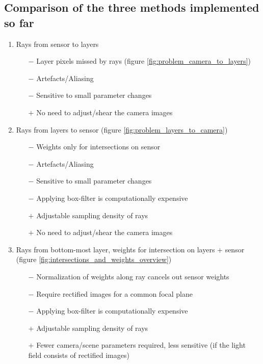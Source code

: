 \documentclass[11pt,a4paper,titlepage]{article}
\begin{document}
\subsection{Comparison of the three methods implemented so far}

\begin{enumerate}
	\item	Rays from sensor to layers
		\begin{itemize}
			\item[$-$]	Layer pixels missed by rays	(figure \ref{fig:problem_camera_to_layers})
			\item[$-$]	Artefacts/Aliasing
			\item[$-$]	Sensitive to small parameter changes
			\item[$+$]	No need to adjust/shear the camera images
		\end{itemize}
	\item	Rays from layers to sensor (figure \ref{fig:problem_layers_to_camera})
		\begin{itemize}
			\item[$-$]	Weights only for intersections on sensor 
			\item[$-$]	Artefacts/Aliasing
			\item[$-$]	Sensitive to small parameter changes
			\item[$-$]	Applying box-filter is computationally expensive
			\item[$+$]	Adjustable sampling density of rays
			\item[$+$]	No need to adjust/shear the camera images
		\end{itemize}
	\item	Rays from bottom-most layer, weights for intersection on layers + sensor (figure \ref{fig:intersections_and_weights_overview})
		\begin{itemize}
			\item[$-$]	Normalization of weights along ray cancels out sensor weights
			\item[$-$]	Require rectified images for a common focal plane
			\item[$-$]	Applying box-filter is computationally expensive
			\item[$+$]	Adjustable sampling density of rays
			\item[$+$]	Fewer camera/scene parameters required, less sensitive (if the light field consists of rectified images)
		\end{itemize}
\end{enumerate}

\clearpage


\end{document}
